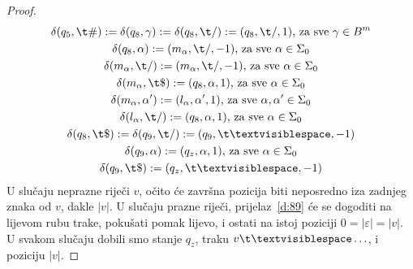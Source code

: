 \begin{proof}
\noindent\begin{gather}
\label{d:81}
    \delta(q_5,\t\#):=\delta(q_8,\gamma):=\delta(q_8,\t/):=(q_8,\t/,1)\text{, za sve }\gamma\in B^m\\
\label{d:82}
    \delta(q_8,\alpha):=(m_\alpha,\t/,-1)\text{, za sve }\alpha\in\Sigma_0\\
\label{d:83}
    \delta(m_\alpha,\t/):=(m_\alpha,\t/,-1)\text{, za sve }\alpha\in\Sigma_0\\
\label{d:84}
    \delta(m_\alpha,\t\$):=(q_8,\alpha,1)\text{, za sve } \alpha\in\Sigma_0\\
\label{d:85}
    \delta(m_\alpha,\alpha'):=(l_\alpha,\alpha',1)\text{, za sve }\alpha,\alpha'\in\Sigma_0\\
\label{d:86}
    \delta(l_\alpha,\t/):=(q_8,\alpha,1)\text{, za sve }\alpha\in\Sigma_0\\
\label{d:87}
    \delta(q_8,\t\$):=\delta(q_9,\t/):=(q_9,\bl,-1)\\
\label{d:88}
    \delta(q_9,\alpha):=(q_z,\alpha,1)\text{, za sve }\alpha\in\Sigma_0\\
\label{d:89}
    \delta(q_9,\t\$):=(q_z,\bl,-1)
\end{gather}
U slučaju neprazne riječi $v$, očito će završna pozicija biti neposredno iza zadnjeg znaka od $v$, dakle $\left|v\right|$. U slučaju prazne riječi, prijelaz~\eqref{d:89} će se dogoditi na lijevom rubu trake, pokušati pomak lijevo, i ostati na istoj poziciji $0=\left|\varepsilon\right|=\left|v\right|$. U svakom slučaju dobili smo stanje $q_z$, traku $v\bl\ldots$, i poziciju $\left|v\right|$.
\end{proof}

